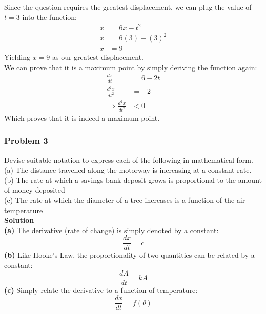 \documentclass[hidelinks, a4paper, 12pt]{article}
\newcommand{\bd}{\textbf}
\newcommand{\n}{\\[\baselineskip]}
\newcommand{\thus}{\Rightarrow}
\begin{document}
                Since the question requires the greatest displacement, we can plug the value of $t = 3$ into the function:
                \[\begin{split}
                    x &= 6x - t^2\\
                    x &= 6(3) - (3)^2\\
                    x &= 9
                \end{split}\]
                Yielding $x = 9$ as our greatest displacement.\n
                We can prove that it is a maximum point by simply deriving the function again:
                \[\begin{split}
                    \frac{dx}{dt} &= 6 - 2t\\
                    \frac{d^2x}{dt^2} &= -2\\
                    \thus \frac{d^2x}{dt^2} &< 0
                \end{split}\]
                Which proves that it is indeed a maximum point.
            
            \subsubsection{Problem 3}
                Devise suitable notation to express each of the following in mathematical form.\n
                (a) The distance travelled along the motorway is increasing at a constant rate.\n
                (b) The rate at which a savings bank deposit grows is proportional to the amount of money deposited\n
                (c) The rate at which the diameter of a tree increases is a function of the air temperature\n
                \bd{Solution}\n
                \bd{(a)} The derivative (rate of change) is simply denoted by a constant:
                \[\frac{dx}{dt} = c\]
                \bd{(b)} Like Hooke's Law, the proportionality of two quantities can be related by a constant:
                \[\frac{dA}{dt} = kA\]
                \bd{(c)} Simply relate the derivative to a function of temperature:
                \[\frac{dx}{dt} = f(\theta)\]
\end{document}
